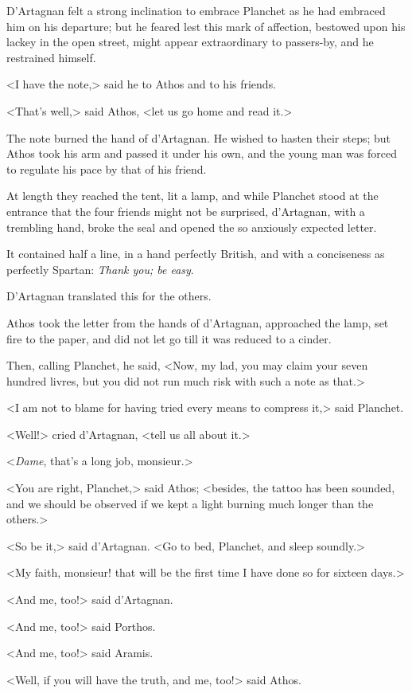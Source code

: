 D'Artagnan felt a strong inclination to embrace Planchet as he had embraced him on his departure; but he feared lest this mark of affection, bestowed upon his lackey in the open street, might appear extraordinary to passers-by, and he restrained himself. 

<I have the note,> said he to Athos and to his friends. 

<That's well,> said Athos, <let us go home and read it.> 

The note burned the hand of d'Artagnan. He wished to hasten their steps; but Athos took his arm and passed it under his own, and the young man was forced to regulate his pace by that of his friend. 

At length they reached the tent, lit a lamp, and while Planchet stood at the entrance that the four friends might not be surprised, d'Artagnan, with a trembling hand, broke the seal and opened the so anxiously expected letter. 

It contained half a line, in a hand perfectly British, and with a conciseness as perfectly Spartan:  \textit{Thank you; be easy}. 

D'Artagnan translated this for the others. 

Athos took the letter from the hands of d'Artagnan, approached the lamp, set fire to the paper, and did not let go till it was reduced to a cinder. 

Then, calling Planchet, he said, <Now, my lad, you may claim your seven hundred livres, but you did not run much risk with such a note as that.> 

<I am not to blame for having tried every means to compress it,> said Planchet. 

<Well!> cried d'Artagnan, <tell us all about it.> 

<\textit{Dame}, that's a long job, monsieur.> 

<You are right, Planchet,> said Athos; <besides, the tattoo has been sounded, and we should be observed if we kept a light burning much longer than the others.> 

<So be it,> said d'Artagnan. <Go to bed, Planchet, and sleep soundly.> 

<My faith, monsieur! that will be the first time I have done so for sixteen days.> 

<And me, too!> said d'Artagnan. 

<And me, too!> said Porthos. 

<And me, too!> said Aramis. 

<Well, if you will have the truth, and me, too!> said Athos. 